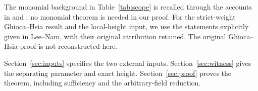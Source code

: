 

The monomial background in Table~\ref{tab:scope} is recalled through
the accounts in \citet[Theorem~1.1]{LeeNam2025} and
\citet{GhiocaHsia2026}; no monomial theorem is needed in our proof.
For the strict-weight Ghioca--Hsia result and the local-height input,
we use the statements explicitly given in Lee--Nam, with their
original attribution retained. The original Ghioca--Hsia proof is
not reconstructed here.

Section~\ref{sec:inputs} specifies the two external inputs.
Section~\ref{sec:witness} gives the separating parameter and exact
height. Section~\ref{sec:proof} proves the theorem, including
sufficiency and the arbitrary-field reduction.
